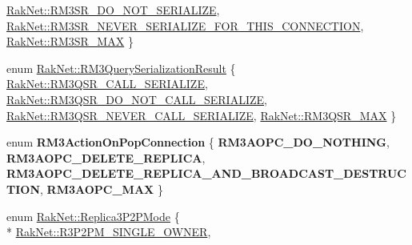 \begin{DoxyCompactItemize}
\hyperlink{group___r_e_p_l_i_c_a___m_a_n_a_g_e_r___g_r_o_u_p3_gga993da25eb23b67455e2438971c51429ca60f8e6fa13b204ae52d20844e00b2a36}{Rak\-Net\-::\-R\-M3\-S\-R\-\_\-\-D\-O\-\_\-\-N\-O\-T\-\_\-\-S\-E\-R\-I\-A\-L\-I\-Z\-E}, 
\hyperlink{group___r_e_p_l_i_c_a___m_a_n_a_g_e_r___g_r_o_u_p3_gga993da25eb23b67455e2438971c51429ca113936a2cd1690f9d2d3abfdf85d665c}{Rak\-Net\-::\-R\-M3\-S\-R\-\_\-\-N\-E\-V\-E\-R\-\_\-\-S\-E\-R\-I\-A\-L\-I\-Z\-E\-\_\-\-F\-O\-R\-\_\-\-T\-H\-I\-S\-\_\-\-C\-O\-N\-N\-E\-C\-T\-I\-O\-N}, 
\hyperlink{group___r_e_p_l_i_c_a___m_a_n_a_g_e_r___g_r_o_u_p3_gga993da25eb23b67455e2438971c51429cab220e8bd7e6c81016a4436c1767fc48d}{Rak\-Net\-::\-R\-M3\-S\-R\-\_\-\-M\-A\-X}
 \}
\item 
enum \hyperlink{group___r_e_p_l_i_c_a___m_a_n_a_g_e_r___g_r_o_u_p3_ga9a29b413d7f2b9cb21c16457631d3aef}{Rak\-Net\-::\-R\-M3\-Query\-Serialization\-Result} \{ \hyperlink{group___r_e_p_l_i_c_a___m_a_n_a_g_e_r___g_r_o_u_p3_gga9a29b413d7f2b9cb21c16457631d3aefac2394e5a4e4008d90c922bed6932303d}{Rak\-Net\-::\-R\-M3\-Q\-S\-R\-\_\-\-C\-A\-L\-L\-\_\-\-S\-E\-R\-I\-A\-L\-I\-Z\-E}, 
\hyperlink{group___r_e_p_l_i_c_a___m_a_n_a_g_e_r___g_r_o_u_p3_gga9a29b413d7f2b9cb21c16457631d3aefac45e556d9b4239415bd63e5bede8ca51}{Rak\-Net\-::\-R\-M3\-Q\-S\-R\-\_\-\-D\-O\-\_\-\-N\-O\-T\-\_\-\-C\-A\-L\-L\-\_\-\-S\-E\-R\-I\-A\-L\-I\-Z\-E}, 
\hyperlink{group___r_e_p_l_i_c_a___m_a_n_a_g_e_r___g_r_o_u_p3_gga9a29b413d7f2b9cb21c16457631d3aefa22b7a36a8c1481cc6345d8c4efbe4aac}{Rak\-Net\-::\-R\-M3\-Q\-S\-R\-\_\-\-N\-E\-V\-E\-R\-\_\-\-C\-A\-L\-L\-\_\-\-S\-E\-R\-I\-A\-L\-I\-Z\-E}, 
\hyperlink{group___r_e_p_l_i_c_a___m_a_n_a_g_e_r___g_r_o_u_p3_gga9a29b413d7f2b9cb21c16457631d3aefa2cd620253580e8d24a1b7957799c3d7a}{Rak\-Net\-::\-R\-M3\-Q\-S\-R\-\_\-\-M\-A\-X}
 \}
\item 
enum {\bfseries R\-M3\-Action\-On\-Pop\-Connection} \{ {\bfseries R\-M3\-A\-O\-P\-C\-\_\-\-D\-O\-\_\-\-N\-O\-T\-H\-I\-N\-G}, 
{\bfseries R\-M3\-A\-O\-P\-C\-\_\-\-D\-E\-L\-E\-T\-E\-\_\-\-R\-E\-P\-L\-I\-C\-A}, 
{\bfseries R\-M3\-A\-O\-P\-C\-\_\-\-D\-E\-L\-E\-T\-E\-\_\-\-R\-E\-P\-L\-I\-C\-A\-\_\-\-A\-N\-D\-\_\-\-B\-R\-O\-A\-D\-C\-A\-S\-T\-\_\-\-D\-E\-S\-T\-R\-U\-C\-T\-I\-O\-N}, 
{\bfseries R\-M3\-A\-O\-P\-C\-\_\-\-M\-A\-X}
 \}
\item 
enum \hyperlink{group___r_e_p_l_i_c_a___m_a_n_a_g_e_r___g_r_o_u_p3_ga91a588da9d58bc86b8fb7e4f27ddcf7e}{Rak\-Net\-::\-Replica3\-P2\-P\-Mode} \{ \\*
\hyperlink{group___r_e_p_l_i_c_a___m_a_n_a_g_e_r___g_r_o_u_p3_gga91a588da9d58bc86b8fb7e4f27ddcf7eae6bb229afa26313b6aa4c11320e630d5}{Rak\-Net\-::\-R3\-P2\-P\-M\-\_\-\-S\-I\-N\-G\-L\-E\-\_\-\-O\-W\-N\-E\-R}, 

\end{DoxyCompactItemize}
